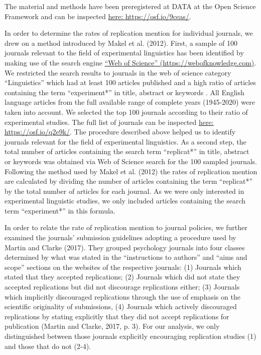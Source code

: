 \documentclass[]{elsarticle} %
\begin{document}
The material and methods have been preregistered at DATA at the Open
Science Framework and can be inspected
\href{https://osf.io/9ceas/}{here: https://osf.io/9ceas/}.

In order to determine the rates of replication mention for individual
journals, we drew on a method introduced by Makel et al. (2012). First,
a sample of 100 journals relevant to the field of experimental
linguistics has been identified by making use of the search engine
\href{https://webofknowledge.com}{``Web of Science''
(https://webofknowledge.com)}. We restricted the search results to
journals in the web of science category ``Linguistics'' which had at
least 100 articles published and a high ratio of articles containing the
term ``experiment*'' in title, abstract or keywords . All English
language articles from the full available range of complete years
(1945-2020) were taken into account. We selected the top 100 journals
according to their ratio of experimental studies. The full list of
journals can be inspected \href{https://osf.io/q2e9k/}{here:
https://osf.io/q2e9k/}. The procedure described above helped us to
identify journals relevant for the field of experimental linguistics. As
a second step, the total number of articles containing the search term
``replicat*'' in title, abstract or keywords was obtained via Web of
Science search for the 100 sampled journals. Following the method used
by Makel et al. (2012) the rates of replication mention are calculated
by dividing the number of articles containing the term ``replicat*'' by
the total number of articles for each journal. As we were only
interested in experimental linguistic studies, we only included articles
containing the search term ``experiment*'' in this formula.

In order to relate the rate of replication mention to journal policies,
we further examined the journals' submission guidelines adopting a
procedure used by Martin and Clarke (2017). They grouped psychology
journals into four classes determined by what was stated in the
``instructions to authors'' and ``aims and scope'' sections on the
websites of the respective journals: (1) Journals which stated that they
accepted replications; (2) Journals which did not state they accepted
replications but did not discourage replications either; (3) Journals
which implicitly discouraged replications through the use of emphasis on
the scientific originality of submissions, (4) Journals which actively
discouraged replications by stating explicitly that they did not accept
replications for publication (Martin and Clarke, 2017, p. 3). For our
analysis, we only distinguished between those journals explicitly
encouraging replication studies (1) and those that do not (2-4).
\end{document}

